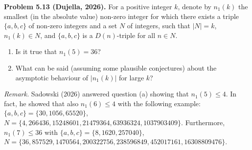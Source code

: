 \textbf{Problem 5.13 (Dujella, 2026).} For a positive integer $k$, denote by $n_1(k)$ the smallest (in the absolute value) non-zero integer for which there exists a triple $\{a,b,c\}$ of non-zero integers and a set $N$ of integers, such that $|N|=k$, $n_1(k) \in N$, and $\{a,b,c\}$ is a $D(n)$-triple for all $n \in N$.
\begin{enumerate}
\item[(a)] Is it true that $n_1(5)=36$?
\item[(b)] What can be said (assuming some plausible conjectures) about the asymptotic behaviour of $|n_1(k)|$ for large $k$?
\end{enumerate}

\medskip

\textit{Remark.} Sadowski (2026) answered question (a) showing that $n_1(5) \leqslant 4$. In fact, he showed that also $n_1(6) \leqslant 4$ with the following example: $\{a,b,c\}=\{30,1056,65520\}$, $N=\{4,266436,15248601,21479364,63936324,1037903409\}$. Furthermore, $n_1(7) \leqslant 36$ with $\{a,b,c\}=\{8,1620,257040\}$, $N=\{36,857529,1470564,200322756,238596849,452017161,16308809476\}$.

